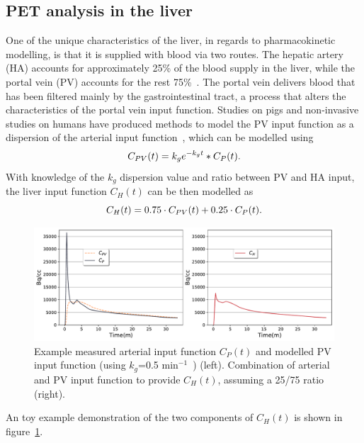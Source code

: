 \subsection{PET analysis in the liver}
\label{liver_PV_theory}
One of the unique characteristics of the liver, in regards to pharmacokinetic modelling, is that it is supplied with blood via two routes. The hepatic artery (HA) accounts for approximately 25\% of the blood supply in the liver, while the portal vein (PV) accounts for the rest 75\%~\cite{Winterdahl2011}. The portal vein delivers blood that has been filtered mainly by the gastrointestinal tract, a process that alters the characteristics of the portal vein input function. 
Studies on pigs and non-invasive studies on humans have produced methods to model the PV input function as a dispersion of the arterial input function~\cite{Kudomi2008}, which can be modelled using 
%
\begin{equation} 
{C_{PV}}(t)  = {k_g} e^{-k_g t} \ast C_P(t)   \\ . \\
\label{eqn:PortalVein}
\end{equation}
%
With knowledge of the $k_g$ dispersion value and ratio between PV and HA input, the liver input function ${C_{H}}(t)$ can be then modelled as
%
\begin{equation} 
{C_{H}}(t)  = 0.75 \cdot C_{PV}(t) + 0.25 \cdot C_{P}(t)  \\ . \\
\label{eqn:HepaticInput}
\end{equation}
\begin{figure} [ht!]
\centering
\includegraphics[scale=0.53,angle=0]{2_Theory_Methods/figures/2_2_LiverDualInputFunction.pdf}
\caption[Example measured arterial input function $C_{P}(t)$ and modelled PV input function (using $k_g$=0.5 min$^{-1}$) (left). Combination of arterial and PV input function to provide ${C_{H}}(t)$, assuming a 25/75 ratio (right).]{Example measured arterial input function $C_{P}(t)$ and modelled PV input function (using $k_g$=0.5 min$^{-1}$~\cite{Kudomi2008}) (left). Combination of arterial and PV input function to provide ${C_{H}}(t)$, assuming a 25/75 ratio (right).} 
\label{fig_2_2:LiverDualInputFunction}
\end{figure} 
An toy example demonstration of the two components of ${C_{H}}(t)$ is shown in figure~\ref{fig_2_2:LiverDualInputFunction}.
%

